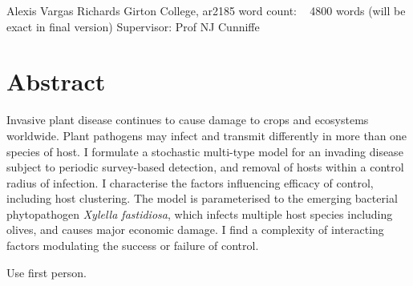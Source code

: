 \documentclass[11pt,letterpaper]{article}
\begin{document}
\vspace*{0.2in}

\begin{flushleft}
{\Large
\textbf{} %
}
\newline

Alexis Vargas Richards 
\bigskip
\newline Girton College, ar2185
\newline word count: ~ 4800 words (will be exact in final version)
\newline
Supervisor: Prof NJ Cunniffe 
\bigskip


\end{flushleft}

\newpage
\section*{Abstract}

Invasive plant disease continues to cause damage to crops and ecosystems worldwide. Plant pathogens may infect and transmit differently in more than one species of host. I formulate a stochastic multi-type model for an invading disease subject to periodic survey-based detection, and removal of hosts within a control radius of infection. I characterise the factors influencing efficacy of control, including host clustering. The model is parameterised to the emerging bacterial phytopathogen \emph{Xylella fastidiosa}, which infects multiple host species including olives, and causes major economic damage. I find a complexity of interacting factors modulating the success or failure of control. 


\bigskip
 Use first person. 
\end{document}
